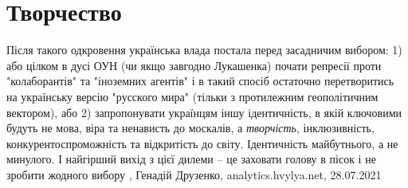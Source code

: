  
 
 
 
 
\chapter{Творчество}

Після такого одкровення українська влада постала перед засадничим вибором: 1)
або цілком в дусі ОУН (чи якщо завгодно Лукашенка) почати репресії проти
"колаборантів" та "іноземних агентів" і в такий спосіб остаточно перетворитись
на українську версію "русского мира" (тільки з протилежним геополітичним
вектором), або 2) запропонувати українцям іншу ідентичність, в якій ключовими
будуть не мова, віра та ненависть до москалів, а \emph{творчість},
інклюзивність, конкурентоспроможність та відкритість до світу. Ідентичність
майбутнього, а не минулого.  І найгірший вихід з цієї дилеми – це заховати
голову в пісок і не зробити жодного вибору
, 
Генадій Друзенко, analytics.hvylya.net, 28.07.2021

